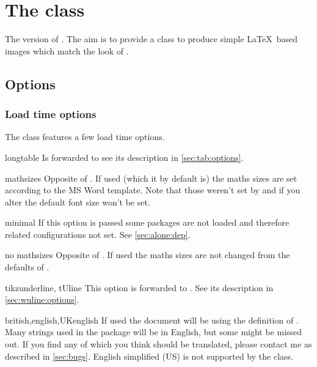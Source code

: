 \chapter{The  class}
The  version of . The aim is to provide a class
to produce simple \LaTeX\ based images which match the look of .

\section{Options}%
\subsection{Load time options}%
The class features a few load time options.
\begin{describeopt}{longtable}
  Is forwarded to  see its description in \autoref{sec:tab:options}.
\end{describeopt}
\begin{describeopt}{mathsizes}
  Opposite of . If used (which it by default is) the maths
  sizes are set according to the MS Word template. Note that those weren't set
  by  and if you alter the default font size won't be set.
\end{describeopt}
\begin{describeopt}{minimal}
  If this option is passed some packages are not loaded and therefore related
  configurations not set. See \autoref{sec:alone:dep}.
\end{describeopt}
\begin{describeopt}{no mathsizes}
  Opposite of . If used the maths sizes are not changed from the
  defaults of .
\end{describeopt}
\begin{describeopt}{tikzunderline, tUline}
  This option is forwarded to . See its description in
  \autoref{sec:wuline:options}.
\end{describeopt}
\begin{describeopt}{british,english,UKenglish}
  If used the document will be using the  definition of
  . Many strings used in the package will be in English, but some
  might be missed out. If you find any of which you think should be translated,
  please contact me as described in \autoref{sec:bugs}. English simplified (US)
  is not supported by the class.
\end{describeopt}
